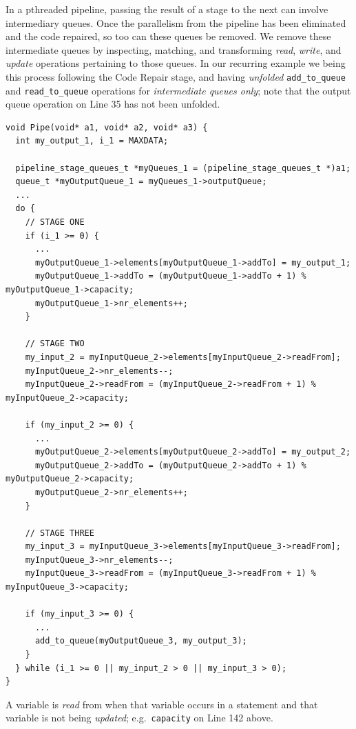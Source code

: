 In a pthreaded pipeline, passing the result of a stage to the next can involve intermediary queues. Once the parallelism from the pipeline has been eliminated and the code repaired, so too can these queues be removed.
%
%
We remove these intermediate queues by inspecting, matching, and transforming \emph{read}, \emph{write}, and \emph{update} operations pertaining to those queues.
%
In our recurring example we being this process following the Code Repair stage, and having \emph{unfolded} \lstinline|add_to_queue| and \lstinline|read_to_queue| operations for \emph{intermediate queues only}; note that the output queue operation on Line 35 has not been unfolded.
%
\begin{lstlisting}[frame=single]
void Pipe(void* a1, void* a2, void* a3) {
  int my_output_1, i_1 = MAXDATA;
  
  pipeline_stage_queues_t *myQueues_1 = (pipeline_stage_queues_t *)a1;
  queue_t *myOutputQueue_1 = myQueues_1->outputQueue;
  ...
  do {
    // STAGE ONE
    if (i_1 >= 0) { 
      ...
      myOutputQueue_1->elements[myOutputQueue_1->addTo] = my_output_1;
      myOutputQueue_1->addTo = (myOutputQueue_1->addTo + 1) % myOutputQueue_1->capacity;
      myOutputQueue_1->nr_elements++;
    }

    // STAGE TWO
    my_input_2 = myInputQueue_2->elements[myInputQueue_2->readFrom];
    myInputQueue_2->nr_elements--;
    myInputQueue_2->readFrom = (myInputQueue_2->readFrom + 1) % myInputQueue_2->capacity;

    if (my_input_2 >= 0) {
      ...
      myOutputQueue_2->elements[myOutputQueue_2->addTo] = my_output_2;
      myOutputQueue_2->addTo = (myOutputQueue_2->addTo + 1) % myOutputQueue_2->capacity;
      myOutputQueue_2->nr_elements++;
    }
    
    // STAGE THREE
    my_input_3 = myInputQueue_3->elements[myInputQueue_3->readFrom];
    myInputQueue_3->nr_elements--;
    myInputQueue_3->readFrom = (myInputQueue_3->readFrom + 1) % myInputQueue_3->capacity;
    
    if (my_input_3 >= 0) {
      ...
      add_to_queue(myOutputQueue_3, my_output_3);
    }
  } while (i_1 >= 0 || my_input_2 > 0 || my_input_3 > 0);
}
\end{lstlisting}
%
A variable is \emph{read} from when that variable occurs in a statement and that variable is not being \emph{updated}; e.g.\ \lstinline|capacity| on Line 142 above.
